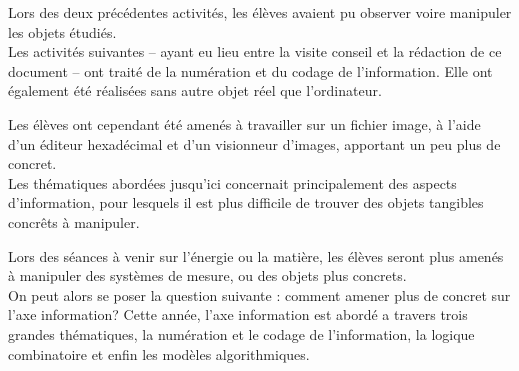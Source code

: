 \documentclass[pdftex,a4paper,12pt]{article}
\begin{document}
	Lors des deux précédentes activités, les élèves avaient pu observer voire manipuler les objets étudiés.\\

	Les activités suivantes -- ayant eu lieu entre la visite conseil et la rédaction de ce document -- ont traité de la numération et du codage de l'information.
	Elle ont également été réalisées sans autre objet réel que l'ordinateur.
	
	Les élèves ont cependant été amenés à travailler sur un fichier image, à l'aide d'un éditeur hexadécimal et d'un visionneur d'images, 
	apportant un peu plus de concret.\\

	Les thématiques abordées jusqu'ici concernait principalement des aspects d'information, 
	pour lesquels il est plus difficile de trouver des objets tangibles concrêts à manipuler. 
	
	Lors des séances à venir sur l'énergie ou la matière, les élèves seront plus amenés à manipuler des systèmes de mesure, ou des objets plus concrets.\\

	On peut alors se poser la question suivante : comment amener plus de concret sur l'axe information?
	Cette année, l'axe information est abordé a travers trois grandes thématiques, la numération et le codage de l'information, la logique combinatoire 
	et enfin les modèles algorithmiques.
\end{document}
